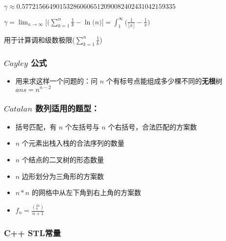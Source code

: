 \documentclass[]{article}
\providecommand{\tightlist}{%
  \setlength{\itemsep}{0pt}\setlength{\parskip}{0pt}}
\begin{document}
\(\gamma \approx 0.57721 56649 01532 86060 65120 90082 40243 10421 59335\)

\(\gamma = \lim_{x \to \infty} \big[\big(\sum^{n}_{k = 1} \frac{1}{k} - \ln(n\big)\big] = \int_{1}^{\infty} \big(\frac{1}{\lfloor x \rfloor} - \frac{1}{x} \big)\)

用于计算调和级数极限(\(\sum^n_{k = 1} \frac{1}{k}\))

\hypertarget{cayley-ux516cux5f0f}{%
\subsubsection{\texorpdfstring{\(Cayley\)
公式}{Cayley 公式}}\label{cayley-ux516cux5f0f}}

\begin{itemize}
\tightlist
\item
  用来求这样一个问题的：问 \(n\)
  个有标号点能组成多少棵不同的\textbf{无根}树 \(ans=n^{n-2}\)
\end{itemize}

\hypertarget{catalan-ux6570ux5217ux9002ux7528ux7684ux9898ux578b}{%
\subsubsection{\texorpdfstring{\(Catalan\)
数列适用的题型：}{Catalan 数列适用的题型：}}\label{catalan-ux6570ux5217ux9002ux7528ux7684ux9898ux578b}}

\begin{itemize}
\item
  括号匹配，有 \(n\) 个左括号与 \(n\) 个右括号，合法匹配的方案数
\item
  \(n\) 个元素出栈入栈的合法序列的数量
\item
  \(n\) 个结点的二叉树的形态数量
\item
  \(n\) 边形划分为三角形的方案数
\item
  \(n*n\) 的网格中从左下角到右上角的方案数
\item
  \(f_n=\frac{(_n^{2n})}{n+1}\)
\end{itemize}

\hypertarget{c-stlux5e38ux91cf}{%
\subsubsection{C++ STL常量}\label{c-stlux5e38ux91cf}}
\end{document}
